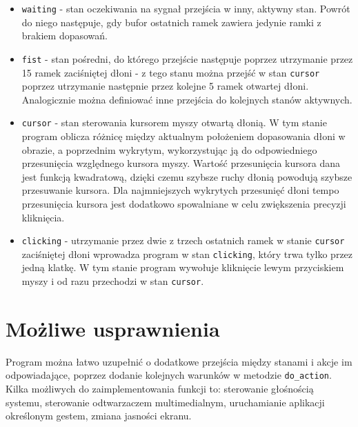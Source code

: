 \documentclass[a4paper,12pt]{article}
\begin{document}
\begin{itemize}
\item \texttt{waiting} - stan oczekiwania na sygnał przejścia w inny, aktywny stan. Powrót do niego następuje, gdy bufor ostatnich ramek zawiera jedynie ramki z brakiem dopasowań.
\item \texttt{fist} - stan pośredni, do którego przejście następuje poprzez utrzymanie przez 15 ramek zaciśniętej dłoni - z tego stanu można przejść w stan \texttt{cursor} poprzez utrzymanie następnie przez kolejne 5 ramek otwartej dłoni. Analogicznie można definiować inne przejścia do kolejnych stanów aktywnych.
\item \texttt{cursor} - stan sterowania kursorem myszy otwartą dłonią. W tym stanie program oblicza różnicę między aktualnym położeniem dopasowania dłoni w obrazie, a poprzednim wykrytym, wykorzystując ją do odpowiedniego przesunięcia względnego kursora myszy. Wartość przesunięcia kursora dana jest funkcją kwadratową, dzięki czemu szybsze ruchy dłonią powodują szybsze przesuwanie kursora. Dla najmniejszych wykrytych przesunięć dłoni tempo przesunięcia kursora jest dodatkowo spowalniane w celu zwiększenia precyzji kliknięcia.
\item \texttt{clicking} - utrzymanie przez dwie z trzech ostatnich ramek w stanie \texttt{cursor} zaciśniętej dłoni wprowadza program w stan \texttt{clicking}, który trwa tylko przez jedną klatkę. W tym stanie program wywołuje kliknięcie lewym przyciskiem myszy i od razu przechodzi w stan \texttt{cursor}.
\end{itemize}

\section{Możliwe usprawnienia}
Program można łatwo uzupełnić o dodatkowe przejścia między stanami i akcje im odpowiadające, poprzez dodanie kolejnych warunków w metodzie \texttt{do_action}.\\
Kilka możliwych do zaimplementowania funkcji to: sterowanie głośnością systemu, sterowanie odtwarzaczem multimedialnym, uruchamianie aplikacji określonym gestem, zmiana jasności ekranu.
\end{document}

